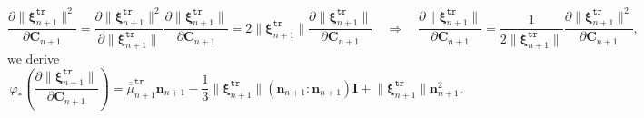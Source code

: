 \documentclass[preprint,11pt]{elsarticle}
\theoremstyle{definition}
\begin{document}
\begin{equation*}
    \dfrac{\partial \lVert \boldsymbol{\xi}_{n+1}^\texttt{tr} \rVert^2}{\partial \mathbf{C}_{n+1}}
    = \dfrac{\partial \lVert \boldsymbol{\xi}_{n+1}^\texttt{tr} \rVert^2}{\partial \lVert \boldsymbol{\xi}_{n+1}^\texttt{tr} \rVert}
    \dfrac{\partial \lVert \boldsymbol{\xi}_{n+1}^\texttt{tr} \rVert}{\partial \mathbf{C}_{n+1}}
    = 2 \lVert \boldsymbol{\xi}_{n+1}^\texttt{tr} \rVert \dfrac{\partial \lVert \boldsymbol{\xi}_{n+1}^\texttt{tr} \rVert}{\partial \mathbf{C}_{n+1}}
    \quad \Rightarrow \quad
    \dfrac{\partial \lVert \boldsymbol{\xi}_{n+1}^\texttt{tr} \rVert}{\partial \mathbf{C}_{n+1}} 
    = \dfrac{1}{2 \lVert \boldsymbol{\xi}_{n+1}^\texttt{tr} \rVert}
    \dfrac{\partial \lVert \boldsymbol{\xi}_{n+1}^\texttt{tr} \rVert^2}{\partial \mathbf{C}_{n+1}},
\end{equation*}
we derive
\begin{equation*}
    \varphi_* \left( \dfrac{\partial \lVert \boldsymbol{\xi}_{n+1}^\texttt{tr} \rVert}{\partial \mathbf{C}_{n+1}} \right)
    = \overline{\overline{\mu}}_{n+1}^\texttt{tr} \mathbf{n}_{n+1}
    - \dfrac{1}{3} \lVert \boldsymbol{\xi}_{n+1}^\texttt{tr} \rVert \left( \mathbf{n}_{n+1} : \mathbf{n}_{n+1} \right) \mathbf{I}
    + \lVert \boldsymbol{\xi}_{n+1}^\texttt{tr} \rVert \mathbf{n}_{n+1}^2.
\end{equation*}
\end{document}
